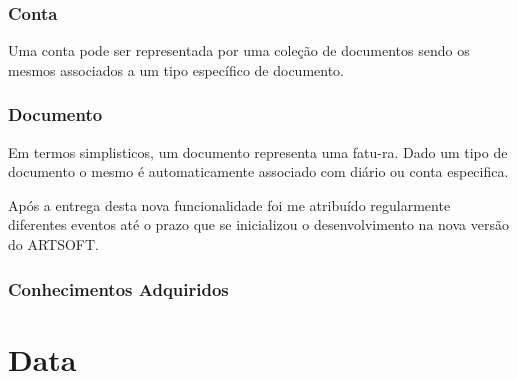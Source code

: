 \documentclass[sigplan]{acmart}
\begin{document}
\subsubsection{Conta}

Uma conta pode ser representada por uma coleção de documentos sendo os mesmos associados a um tipo específico de documento.

\subsubsection{Documento}

Em termos simplisticos, um documento representa uma fatu-ra. Dado um tipo de documento o mesmo é automaticamente associado com diário ou conta especifica.

Após a entrega desta nova funcionalidade foi me atribuído regularmente diferentes eventos até o prazo que se inicializou o desenvolvimento na nova versão do ARTSOFT.

\subsubsection{Conhecimentos Adquiridos}

 

\section{Data} \label{sec:data}
\end{document}
